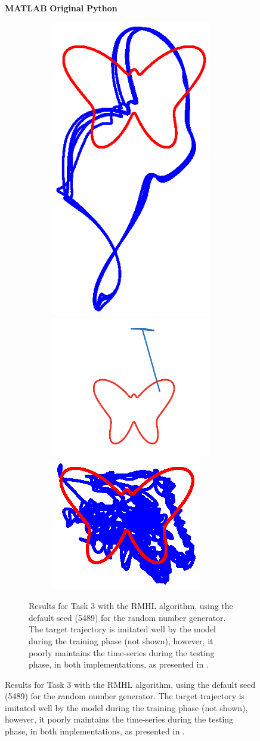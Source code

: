 
\begin{figure}

    \centering
    \textbf{MATLAB}\hspace{8em}
    \textbf{Original}\hspace{8em}
    \textbf{Python}
    

    \begin{subfigure}{\textwidth}
        \centering
        
        \textbf{}\begin{subfigure}{\textwidth}
        \centering
        
        \hspace{-1em}
        \includegraphics[trim=3cm 0.5cm 3cm 4cm, clip=true, height=.25\linewidth]{Figures/Fig_T4/MATLAB/RMHL_T3_Trajectory.eps}
        \hspace{3em}
        \includegraphics[trim=1cm 0cm 1cm 0cm, clip=true,scale=0.5,
        height=.25\linewidth]{Figures/Fig_T4/Orig/RMHL_T3_Trajectory.png}
        \hspace{3em}
        \includegraphics[trim=6cm 4.5cm 6cm 3cm, clip=true,  height=.25\linewidth]{Figures/Fig_T4/Python/RMHL_T3_Trajectory.eps}
        
        \end{subfigure}
         
        
        
    \caption{Results for Task 3 with the RMHL algorithm, using the default seed (5489) for the random number generator. The target trajectory is imitated well by the model during the training phase (not shown), however, it poorly maintains the time-series during the testing phase, in both implementations, as presented in \cite{pyle2019}.}
    \label{Fig:compTask3RMHL}
    \end{subfigure}
    

\end{figure}
